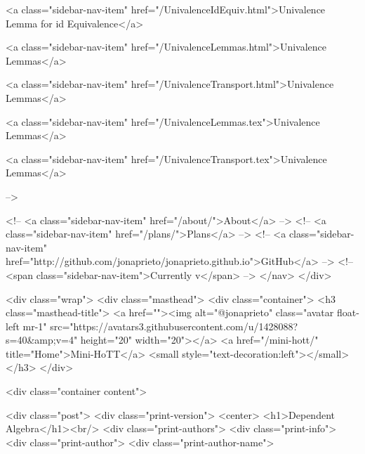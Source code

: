      
    
      
        
          <a class="sidebar-nav-item" href="/UnivalenceIdEquiv.html">Univalence Lemma for id Equivalence</a>
        
      
    
      
        
          <a class="sidebar-nav-item" href="/UnivalenceLemmas.html">Univalence Lemmas</a>
        
      
    
      
        
          <a class="sidebar-nav-item" href="/UnivalenceTransport.html">Univalence Lemmas</a>
        
      
    
      
        
          <a class="sidebar-nav-item" href="/UnivalenceLemmas.tex">Univalence Lemmas</a>
        
      
    
      
        
          <a class="sidebar-nav-item" href="/UnivalenceTransport.tex">Univalence Lemmas</a>
        
      
     -->

    <!-- <a class="sidebar-nav-item" href="/about/">About</a> -->
    <!-- <a class="sidebar-nav-item" href="/plans/">Plans</a> -->
    <!-- <a class="sidebar-nav-item" href="http://github.com/jonaprieto/jonaprieto.github.io">GitHub</a> -->
    <!-- <span class="sidebar-nav-item">Currently v</span> -->
  </nav>
</div>

    <div class="wrap">
      <div class="masthead">
        <div class="container">
          <h3 class="masthead-title">
            <a href=""><img alt="@jonaprieto" class="avatar float-left mr-1" src="https://avatars3.githubusercontent.com/u/1428088?s=40&amp;v=4" height="20" width="20"></a>
            <a href="/mini-hott/" title="Home">Mini-HoTT</a>
            <small style="text-decoration:left"></small>
          </h3>
        </div>
      
      <div class="container content">
        







<div class="post">
  <div class="print-version">
    <center>
      <h1>Dependent Algebra</h1><br/>
        <div class="print-authors">
          <div class="print-info">
            <div class="print-author">
              <div class="print-author-name">
                
